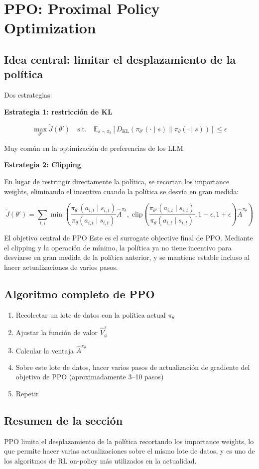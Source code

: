 \section{PPO: Proximal Policy Optimization}

\subsection{Idea central: limitar el desplazamiento de la política}

Dos estrategias:

\textbf{Estrategia 1: restricción de KL}

$$\max_{\theta'} \tilde{J}(\theta') \quad \text{s.t.} \quad \mathbb{E}_{s \sim \pi_\theta}\left[D_{\mathrm{KL}}\left(\pi_{\theta'}(\cdot \mid s) \| \pi_\theta(\cdot \mid s)\right)\right] \leq \epsilon$$

Muy común en la optimización de preferencias de los LLM.

\textbf{Estrategia 2: Clipping}

En lugar de restringir directamente la política, se recortan los importance weights, eliminando el incentivo cuando la política se desvía en gran medida:

$$\tilde{J}(\theta') = \sum_{t,i} \min\left(\frac{\pi_{\theta'}(a_{i,t} \mid s_{i,t})}{\pi_\theta(a_{i,t} \mid s_{i,t})} \hat{A}^{\pi_\theta}, \; \mathrm{clip}\left(\frac{\pi_{\theta'}(a_{i,t} \mid s_{i,t})}{\pi_\theta(a_{i,t} \mid s_{i,t})}, 1-\epsilon, 1+\epsilon\right) \hat{A}^{\pi_\theta}\right)$$

\begin{importantbox}{El objetivo central de PPO}
Este es el surrogate objective final de PPO. Mediante el clipping y la operación de mínimo, la política ya no tiene incentivo para desviarse en gran medida de la política anterior, y se mantiene estable incluso al hacer actualizaciones de varios pasos.
\end{importantbox}

\subsection{Algoritmo completo de PPO}

\begin{enumerate}
    \item Recolectar un lote de datos con la política actual $\pi_\theta$
    \item Ajustar la función de valor $\hat{V}^\pi_\phi$
    \item Calcular la ventaja $\hat{A}^{\pi_\theta}$
    \item Sobre este lote de datos, hacer varios pasos de actualización de gradiente del objetivo de PPO (aproximadamente 3--10 pasos)
    \item Repetir
\end{enumerate}

\subsection{Resumen de la sección}

PPO limita el desplazamiento de la política recortando los importance weights, lo que permite hacer varias actualizaciones sobre el mismo lote de datos, y es uno de los algoritmos de RL on-policy más utilizados en la actualidad.

